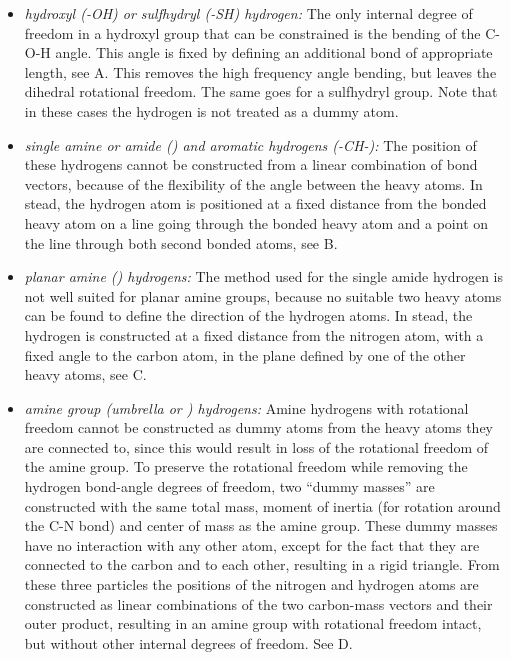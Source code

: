 \begin{itemize}

\item{\em hydroxyl ({\sf -OH}) or sulfhydryl ({\sf -SH})
hydrogen:\/} The only internal degree of freedom in a hydroxyl group
that can be constrained is the bending of the {\sf C-O-H} angle. This
angle is fixed by defining an additional bond of appropriate length,
see A. This removes the high frequency angle bending,
but leaves the dihedral rotational freedom. The same goes for a
sulfhydryl group. Note that in these cases the hydrogen is not treated
as a dummy atom.

\item{\em single amine or amide ({\amines}) and aromatic hydrogens
({\sf -CH-}):\/} The position of these hydrogens cannot be constructed
from a linear combination of bond vectors, because of the flexibility
of the angle between the heavy atoms. In stead, the hydrogen atom is
positioned at a fixed distance from the bonded heavy atom on a line
going through the bonded heavy atom and a point on the line through
both second bonded atoms, see B.

\item{\em planar amine ({\amine}) hydrogens:\/} The method used for
the single amide hydrogen is not well suited for planar amine groups,
because no suitable two heavy atoms can be found to define the
direction of the hydrogen atoms. In stead, the hydrogen is constructed
at a fixed distance from the nitrogen atom, with a fixed angle to the
carbon atom, in the plane defined by one of the other heavy atoms, see
C.

\item{\em amine group (umbrella {\amine} or {\aminep}) hydrogens:\/}
Amine hydrogens with rotational freedom cannot be constructed as dummy
atoms from the heavy atoms they are connected to, since this would
result in loss of the rotational freedom of the amine group. To
preserve the rotational freedom while removing the hydrogen bond-angle
degrees of freedom, two ``dummy masses'' are constructed with the same
total mass, moment of inertia (for rotation around the {\sf C-N} bond)
and center of mass as the amine group. These dummy masses have no
interaction with any other atom, except for the fact that they are
connected to the carbon and to each other, resulting in a rigid
triangle. From these three particles the positions of the nitrogen and
hydrogen atoms are constructed as linear combinations of the two
carbon-mass vectors and their outer product, resulting in an amine
group with rotational freedom intact, but without other internal
degrees of freedom. See D.

\end{itemize}

